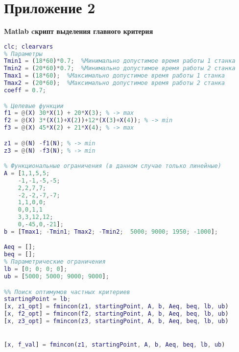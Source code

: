 \section*{Приложение 2}
\textbf{Matlab cкрипт выделения главного критерия}
\begin{lstlisting}[language={matlab}, caption={Скрипт с выделением главного критерия}, label={lst:2}]
clc; clearvars
% Параметры
Tmin1 = (18*60)*0.7;  %Минимально допустимое время работы 1 станка
Tmin2 = (20*60)*0.7;  %Минимально допустимое время работы 2 станка
Tmax1 = (18*60);  %Максимально допустимое время работы 1 станка
Tmax2 = (20*60);  %Максимально допустимое время работы 2 станка
coeff = 0.7;

% Целевые функции
f1 = @(X) 30*X(1) + 20*X(3); % -> max
f2 = @(X) 3*(X(1)+X(2))+12*(X(3)+X(4)); % -> min
f3 = @(X) 45*X(2) + 21*X(4); % -> max

z1 = @(N) -f1(N); % -> min
z3 = @(N) -f3(N); % -> min

% Функциональные ограничения (в данном случае только линейные)
A = [1,1,5,5;
    -1,-1,-5,-5;
    2,2,7,7;
    -2,-2,-7,-7;
    1,1,0,0;
    0,0,1,1
    3,3,12,12;
    0,-45,0,-21];
b = [Tmax1; -Tmin1; Tmax2; -Tmin2;  5000; 9000; 1950; -1000];

Aeq = [];
beq = [];
% Параметрические ограничения
lb = [0; 0; 0; 0];
ub = [5000; 5000; 9000; 9000];

%% Поиск оптимумов частных критериев
startingPoint = lb;
[x, z1_opt] = fmincon(z1, startingPoint, A, b, Aeq, beq, lb, ub)
[x, f2_opt] = fmincon(f2, startingPoint, A, b, Aeq, beq, lb, ub)
[x, z3_opt] = fmincon(z3, startingPoint, A, b, Aeq, beq, lb, ub)


[x, f_val] = fmincon(z1, startingPoint, A, b, Aeq, beq, lb, ub)
\end{lstlisting}

